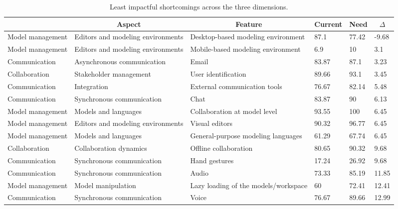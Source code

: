 
  \begin{table*}[]
  \centering
  \notsotiny
  \caption{ Least impactful shortcomings across the three dimensions.}
\label{tab:least-impactful}
\begin{tabular}{|l|l|l|l|l|l|}
  \hline
  \rowcolor[HTML]{C0C0C0}
    \multicolumn{1}{|c|}{Dimension} & \multicolumn{1}{c|}{Aspect} & \multicolumn{1}{c|}{Feature} & \multicolumn{1}{c|}{Current} & \multicolumn{1}{c|}{Need} & \multicolumn{1}{c|}{$\Delta$} \\ \hline
    Model management & Editors and modeling environments & Desktop-based modeling environment & 87.1 & 77.42 & -9.68 \\ \hline 
Model management & Editors and modeling environments & Mobile-based modeling environment & 6.9 & 10 & 3.1 \\ \hline 
Communication & Asynchronous communication & Email & 83.87 & 87.1 & 3.23 \\ \hline 
Collaboration & Stakeholder management & User identification & 89.66 & 93.1 & 3.45 \\ \hline 
Communication & Integration & External communication tools & 76.67 & 82.14 & 5.48 \\ \hline 
Communication & Synchronous communication & Chat & 83.87 & 90 & 6.13 \\ \hline 
Model management & Models and languages & Collaboration at model level & 93.55 & 100 & 6.45 \\ \hline 
Model management & Editors and modeling environments & Visual editors & 90.32 & 96.77 & 6.45 \\ \hline 
Model management & Models and languages & General-purpose modeling languages & 61.29 & 67.74 & 6.45 \\ \hline 
Collaboration & Collaboration dynamics & Offline collaboration & 80.65 & 90.32 & 9.68 \\ \hline 
Communication & Synchronous communication & Hand gestures & 17.24 & 26.92 & 9.68 \\ \hline 
Communication & Synchronous communication & Audio & 73.33 & 85.19 & 11.85 \\ \hline 
Model management & Model manipulation & Lazy loading of the models/workspace & 60 & 72.41 & 12.41 \\ \hline 
Communication & Synchronous communication & Voice & 76.67 & 89.66 & 12.99 \\ \hline 

\end{tabular}
\end{table*}
